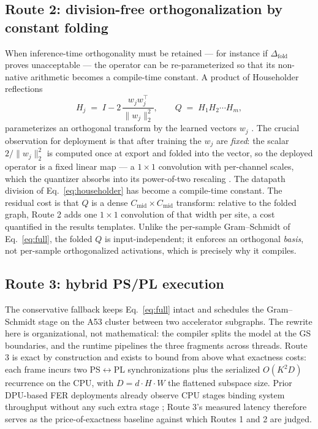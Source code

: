 \documentclass[onecolumn,journal]{IEEEtran}
\begin{document}
\subsection{Route 2: division-free orthogonalization by constant folding}
\label{sec:householder}
When inference-time orthogonality must be retained --- for instance if
$\Delta_{\mathrm{fold}}$ proves unacceptable --- the operator can be re-parameterized so
that its non-native arithmetic becomes a compile-time constant. A product of Householder
reflections
\begin{equation}
H_j \;=\; I - 2\,\frac{w_j w_j^{\!\top}}{\lVert w_j\rVert_2^{2}},
\qquad Q \;=\; H_1 H_2 \cdots H_m ,
\label{eq:householder}
\end{equation}
parameterizes an orthogonal transform by the learned vectors $w_j$
\cite{huang2018own}. The crucial observation for deployment is that after training the
$w_j$ are \emph{fixed}: the scalar $2/\lVert w_j\rVert_2^{2}$ is computed once at export
and folded into the vector, so the deployed operator is a fixed linear map --- a
$1{\times}1$ convolution with per-channel scales, which the quantizer absorbs into its
power-of-two rescaling \cite{amd_ug1414}. The datapath division of
Eq.~\eqref{eq:householder} has become a compile-time constant. The residual cost is that
$Q$ is a dense $C_{\mathrm{mid}}{\times}C_{\mathrm{mid}}$ transform: relative to the
folded graph, Route 2 adds one $1{\times}1$ convolution of that width per site, a cost
quantified in the results templates. Unlike the per-sample Gram--Schmidt of
Eq.~\eqref{eq:full}, the folded $Q$ is input-independent; it enforces an orthogonal
\emph{basis}, not per-sample orthogonalized activations, which is precisely why it
compiles.

\subsection{Route 3: hybrid PS/PL execution}
The conservative fallback keeps Eq.~\eqref{eq:full} intact and schedules the
Gram--Schmidt stage on the A53 cluster between two accelerator subgraphs. The rewrite
here is organizational, not mathematical: the compiler splits the model at the GS
boundaries, and the runtime pipelines the three fragments across threads. Route 3 is
exact by construction and exists to bound from above what exactness costs: each frame
incurs two PS$\leftrightarrow$PL synchronizations plus the serialized $O(K^2 D)$
recurrence on the CPU, with $D=d\cdot H\cdot W$ the flattened subspace size. Prior
DPU-based FER deployments already observe CPU stages binding system throughput without
any such extra stage \cite{ando2025fer}; Route 3's measured latency therefore serves as
the price-of-exactness baseline against which Routes 1 and 2 are judged.
\end{document}
